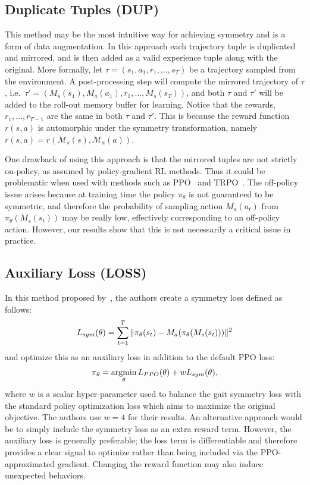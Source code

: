 \subsection{Duplicate Tuples (DUP)}
\label{subsec:dup_epx}
This method may be the most intuitive way for achieving symmetry and is a form of data augmentation.  
In this approach each trajectory tuple is duplicated and mirrored, and is then
added as a valid experience tuple along with the original.  
More formally, let $\tau=(s_1, a_1, r_1, \dots, s_T)$ 
be a trajectory sampled from the environment.  
A post-processing step will compute the mirrored trajectory of $\tau$, 
i.e.\ $\tau' = \left( M_s(s_1), M_a(a_1), r_1, \dots, M_s(s_T) \right)$, and both $\tau$ and $\tau'$ 
will be added to the roll-out memory buffer for learning.  
Notice that the rewards, $r_1, \dots, r_{T-1}$ are the same in both $\tau$ and $\tau'$.  
This is because the reward function $r(s, a)$ is automorphic under the symmetry transformation, namely 
$r(s, a) = r(\mathcal{M}_s(s), \mathcal{M}_a(a))$.

One drawback of using this approach is that the mirrored tuples are not strictly on-policy,
as assumed by policy-gradient RL methods. Thus it could be problematic when used with methods 
such as PPO~\citep{ppo} and TRPO~\citep{trpo}.  
The off-policy issue arises because at training time the policy $\pi_\theta$ is not guaranteed 
to be symmetric, and therefore the probability of sampling action $M_a(a_t)$ from $\pi_\theta(M_s(s_t))$ 
may be really low, effectively corresponding to an off-policy action.
However, our results show that this is not necessarily a critical issue in practice.

\subsection{Auxiliary Loss (LOSS)}
In this method proposed by~\citeauthor{Yu-SIGGRAPH-2018}\cite{Yu-SIGGRAPH-2018}, 
the authors create a symmetry loss defined as follows:
\begin{align}
L_{sym}(\theta) = \sum_{t=1}^{T} \| \pi_\theta(s_t) - M_a ( \pi_\theta( M_s(s_t) ) ) \|^2
\end{align}
and optimize this as an auxiliary loss in addition to the default PPO loss:
\begin{align}
\pi_\theta = \mathop{\hbox{argmin}}_{\theta} L_{PPO}(\theta) + w L_{sym}(\theta),
\end{align}
where $w$ is a scalar hyper-parameter used to balance the gait symmetry loss
with the standard policy optimization loss which aims to maximize the original objective. 
The authors use $w=4$ for their results. 
An alternative approach would be to simply include the symmetry loss as an extra reward term. 
However, the auxiliary loss is generally preferable;
the loss term is differentiable and therefore provides a clear signal to optimize 
rather than being included via the PPO-approximated gradient.  
Changing the reward function may also induce unexpected behaviors.

